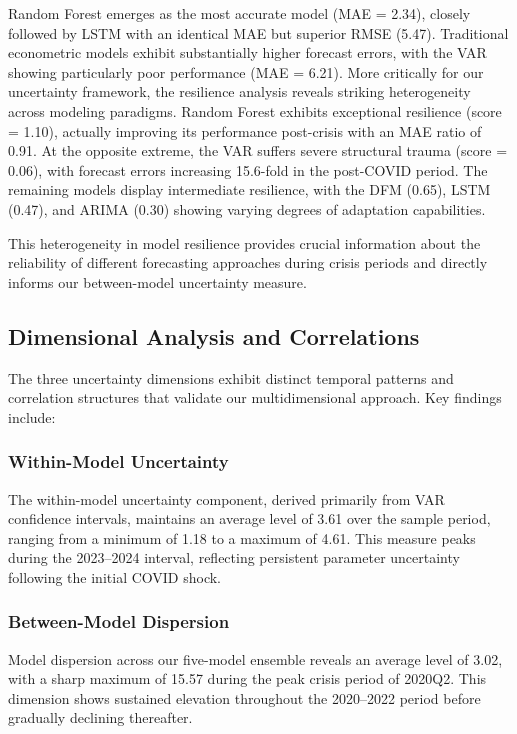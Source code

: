 \documentclass[12pt,a4paper]{article}
\theoremstyle{remark}
\begin{document}
Random Forest emerges as the most accurate model (MAE = 2.34), closely followed by LSTM with an identical MAE but superior RMSE (5.47). Traditional econometric models exhibit substantially higher forecast errors, with the VAR showing particularly poor performance (MAE = 6.21). More critically for our uncertainty framework, the resilience analysis reveals striking heterogeneity across modeling paradigms. Random Forest exhibits exceptional resilience (score = 1.10), actually improving its performance post-crisis with an MAE ratio of 0.91. At the opposite extreme, the VAR suffers severe structural trauma (score = 0.06), with forecast errors increasing 15.6-fold in the post-COVID period. The remaining models display intermediate resilience, with the DFM (0.65), LSTM (0.47), and ARIMA (0.30) showing varying degrees of adaptation capabilities.

This heterogeneity in model resilience provides crucial information about the reliability of different forecasting approaches during crisis periods and directly informs our between-model uncertainty measure.

\subsection{Dimensional Analysis and Correlations}

The three uncertainty dimensions exhibit distinct temporal patterns and correlation structures that validate our multidimensional approach. Key findings include:

\subsubsection{Within-Model Uncertainty}
The within-model uncertainty component, derived primarily from VAR confidence intervals, maintains an average level of 3.61 over the sample period, ranging from a minimum of 1.18 to a maximum of 4.61. This measure peaks during the 2023--2024 interval, reflecting persistent parameter uncertainty following the initial COVID shock.

\subsubsection{Between-Model Dispersion}
Model dispersion across our five-model ensemble reveals an average level of 3.02, with a sharp maximum of 15.57 during the peak crisis period of 2020Q2. This dimension shows sustained elevation throughout the 2020--2022 period before gradually declining thereafter.
\end{document}

